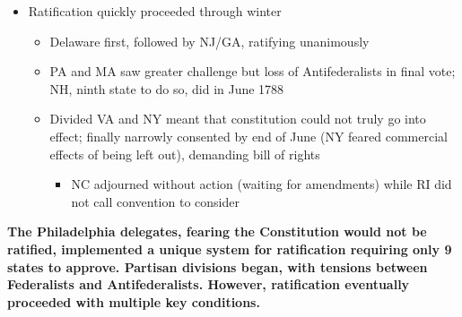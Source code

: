 \documentclass[a4paper]{article}
\begin{document}
{\begin{itemize}
\begin{itemize}
        \end{itemize}
        \item Ratification quickly proceeded through winter
        \begin{itemize}
            \item Delaware first, followed by NJ/GA, ratifying unanimously
            \item PA and MA saw greater challenge but loss of Antifederalists in final vote; NH, ninth state to do so, did in June 1788
            \item Divided VA and NY meant that constitution could not truly go into effect; finally narrowly consented by end of June (NY feared commercial effects of being left out), demanding bill of rights
            \begin{itemize}
                \item NC adjourned without action (waiting for amendments) while RI did not call convention to consider
            \end{itemize}
        \end{itemize}
    \end{itemize}
    \textbf{The Philadelphia delegates, fearing the Constitution would not be ratified, implemented a unique system for ratification requiring only 9 states to approve. Partisan divisions began, with tensions between Federalists and Antifederalists. However, ratification eventually proceeded with multiple key conditions.}}
\end{document}
